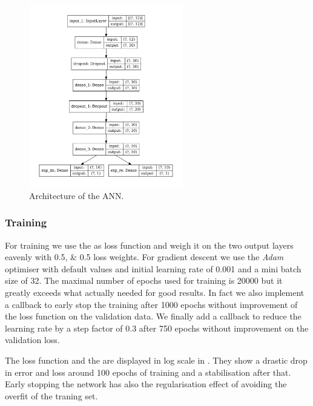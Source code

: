 \begin{figure}[htbp]
  \centering
  \includegraphics[width=0.6\textwidth]{img/ann_arch}
  \caption{Architecture of the ANN.}
  \label{fig:agg:arch}
\end{figure}


\subsubsection{Training}

For training we use the \mse as loss function and weigh it on the two output layers eavenly with \numlist{0.5;0.5} loss weights.\footnotemark{}
For gradient descent we use the \emph{Adam} optimiser with default values and initial learning rate of \num{0.001} and a mini batch size of 32.
The maximal number of epochs used for training is \num{20000} but it greatly exceeds what actually needed for good results.
In fact we also implement a callback to early stop the training after 1000 epochs without improvement of the loss function on the validation data.
We finally add a callback to reduce the learning rate by a step factor of \num{0.3} after 750 epochs without improvement on the validation loss.

The loss function and the \mse are displayed in log scale in .
They show a drastic drop in error and loss around 100 epochs of training and a stabilisation after that.
Early stopping the network has also the regularisation effect of avoiding the overfit of the traning set.

